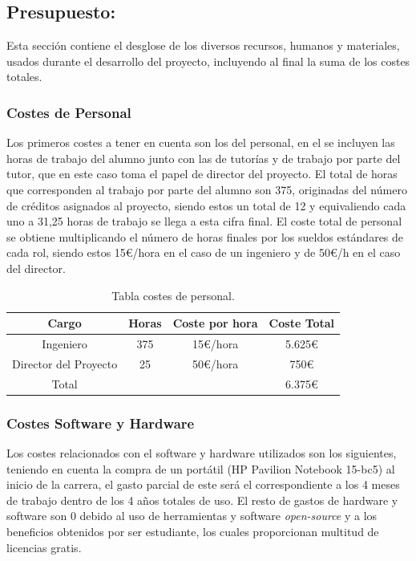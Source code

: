 \subsection{Presupuesto:}
Esta sección contiene el desglose de los diversos recursos, humanos y
materiales, usados durante el desarrollo del proyecto, incluyendo al final la
suma de los costes totales.

\subsubsection{Costes de Personal}
Los primeros costes a tener en cuenta son los del personal, en el se incluyen
las horas de trabajo del alumno junto con las de tutorías y de trabajo por parte
del tutor, que en este caso toma el papel de director del proyecto. El total de
horas que corresponden al trabajo por parte del alumno son 375, originadas del
número de créditos asignados al proyecto, siendo estos un total de 12 y
equivaliendo cada uno a 31,25 horas de trabajo se llega a esta cifra final. El
coste total de personal se obtiene multiplicando el número de horas finales por
los sueldos estándares de cada rol, siendo estos 15€/hora en el caso de un
ingeniero y de 50€/h en el caso del director.

\begin{table}[H]
    \centering
    \begin{tabular}{|c|c|c|c|}
        \hline
        \textbf{Cargo} & \textbf{Horas} & \textbf{Coste por hora} & \textbf{Coste Total} \\
        \hline
        Ingeniero             & 375 & 15€/hora & 5.625€ \\ \hline
        Director del Proyecto & 25  & 50€/hora & 750€   \\ \hline
        Total                 &     &          & 6.375€ \\ \hline
    \end{tabular}
    \caption{Tabla costes de personal.}
    \label{tab:03_29}
\end{table}


\subsubsection{Costes Software y Hardware}
Los costes relacionados con el software y hardware utilizados son los
siguientes, teniendo en cuenta la compra de un portátil (HP Pavilion Notebook
15-bc5) al inicio de la carrera, el gasto parcial de este será el
correspondiente a los 4 meses de trabajo dentro de los 4 años totales de uso. El
resto de gastos de hardware y software son 0 debido al uso de herramientas y
software \textit{open-source} y a los beneficios obtenidos por ser estudiante, los cuales
proporcionan multitud de licencias gratis. 

